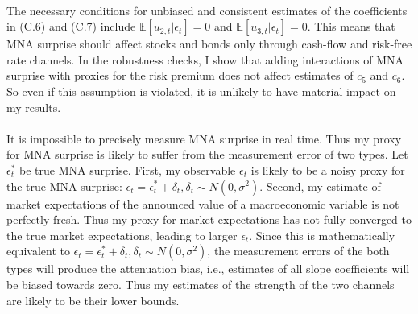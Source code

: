 \documentclass[12pt]{article}
\begin{document}
\paragraph{}
The necessary conditions for unbiased and consistent estimates of the coefficients in (C.6) and (C.7) include $\mathbb{E}[u_{2,t}|\epsilon_t]=0$ and 
$\mathbb{E}[u_{3,t}|\epsilon_t]=0$. This means that MNA surprise should affect stocks and bonds only through cash-flow and risk-free rate channels. In the robustness checks, I show that adding interactions of MNA surprise with proxies for the risk premium does not affect estimates of $c_5$ and $c_6$. So even if this assumption is violated, it is unlikely to have material impact on my results.
\paragraph{}
It is impossible to precisely measure MNA surprise in real time. Thus my proxy for MNA surprise is likely to suffer from the measurement error of two types. Let $\epsilon^*_t$ be true MNA surprise. First, my observable $\epsilon_t$ is likely to be a noisy proxy for the true MNA surprise: $\epsilon_t = \epsilon^*_t + \delta_t, \delta_t \sim{N(0, \sigma^2)}$. Second, my estimate of market expectations of the announced value of a macroeconomic variable is not perfectly fresh. Thus my proxy for market expectations has not fully converged to the true market expectations, leading to larger $\epsilon_t$. Since this is mathematically equivalent to $\epsilon_t = \epsilon^*_t + \delta_t, \delta_t \sim{N(0, \sigma^2)}$, the measurement errors of the both types will produce the attenuation bias, i.e., estimates of all slope coefficients will be biased towards zero. Thus my estimates of the strength of the two channels are likely to be their lower bounds.
\end{document}
